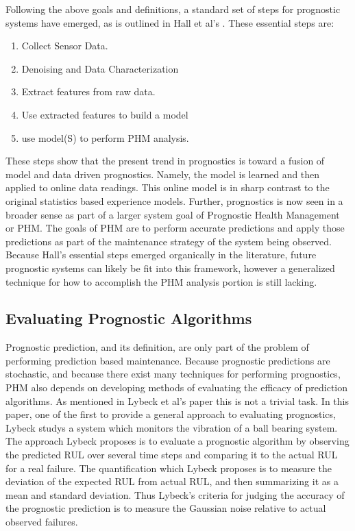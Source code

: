\documentclass[12pt]{article}
\begin{document}
Following the above goals and definitions, a standard set of steps for
prognostic systems have emerged, as is outlined in Hall et al's
\cite{6024332}.  These essential steps are:
\begin{enumerate}
  \item Collect Sensor Data.
  \item Denoising and Data Characterization
  \item Extract features from raw data.
  \item Use extracted features to build a model
  \item use model(S) to perform PHM analysis.
\end{enumerate}
These steps show that the present trend in prognostics is toward a fusion of
model and data driven prognostics.  Namely, the model is learned and then
applied to online data readings.  This online model is in sharp contrast to the
original statistics based experience models.  Further, prognostics is now seen
in a broader sense as part of a larger system goal of Prognostic Health
Management or PHM.  The goals of PHM are to perform accurate predictions and
apply those predictions as part of the maintenance strategy of the system being
observed.  Because Hall's essential steps emerged organically in the
literature, future prognostic systems can likely be fit into this framework,
however a generalized technique for how to accomplish the PHM analysis portion
is still lacking.

\subsection{Evaluating Prognostic Algorithms}
Prognostic prediction, and its definition, are only part of the problem of
performing prediction based maintenance.  Because prognostic predictions are
stochastic, and because there exist many techniques for performing prognostics,
PHM also depends on developing methods of evaluating the efficacy of prediction
algorithms.  As mentioned in Lybeck et al's paper \cite{4161637} this is not a
trivial task.  In this paper, one of the first to provide a general approach to
evaluating prognostics, Lybeck studys a system which monitors the vibration of
a ball bearing system.  The approach Lybeck proposes is to evaluate a
prognostic algorithm by observing the predicted RUL over several time steps and
comparing it to the actual RUL for a real failure.  The quantification which
Lybeck proposes is to measure the deviation of the expected RUL from actual
RUL, and then summarizing it as a mean and standard deviation.  Thus Lybeck's
criteria for judging the accuracy of the prognostic prediction is to measure
the Gaussian noise relative to actual observed failures.  
\end{document}
